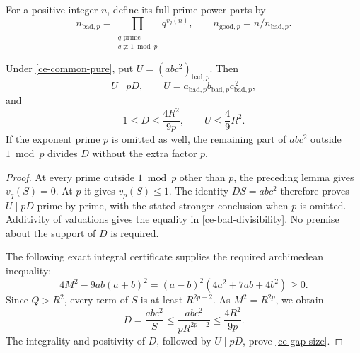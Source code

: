 For a positive integer $n$, define its full prime-power parts by
\[
 n_{\mathrm{bad},p}
 =\prod_{\substack{q\text{ prime}\\q\not\equiv1\bmod p}}q^{v_q(n)},
 \qquad n_{\mathrm{good},p}=n/n_{\mathrm{bad},p}.
\]
\begin{theorem}
\label{ce-bad-budget}
Under \eqref{ce-common-pure}, put $U=(ab c^2)_{\mathrm{bad},p}$.
Then
\begin{equation}\label{ce-bad-divisibility}
 U\mid pD,\qquad
 U=a_{\mathrm{bad},p}b_{\mathrm{bad},p}
       c_{\mathrm{bad},p}^{\,2},
\end{equation}
and
\begin{equation}\label{ce-gap-size}
 1\le D\le\frac{4R^2}{9p},\qquad U\le\frac49R^2.
\end{equation}
If the exponent prime $p$ is omitted as well, the remaining part of
$ab c^2$ outside $1\bmod p$ divides $D$ without the extra factor $p$.
\end{theorem}
\begin{proof}
At every prime outside $1\bmod p$ other than $p$, the preceding
lemma gives $v_q(S)=0$. At $p$ it gives $v_p(S)\le1$.
The identity $DS=ab c^2$ therefore proves $U\mid pD$ prime by
prime, with the stated stronger conclusion when $p$ is omitted.
Additivity of valuations gives the equality in
\eqref{ce-bad-divisibility}. No premise about the support of $D$
is required.

The following exact integral certificate supplies the required
archimedean inequality:
\begin{equation}\label{ce-four-ninths-certificate}
 4M^2-9ab(a+b)^2=(a-b)^2(4a^2+7ab+4b^2)\ge0.
\end{equation}
Since $Q>R^2$, every term of $S$ is at least $R^{2p-2}$.
As $M^2=R^{2p}$, we obtain
\[
 D=\frac{ab c^2}{S}
 \le\frac{ab c^2}{pR^{2p-2}}
 \le\frac{4R^2}{9p}.
\]
The integrality and positivity of $D$, followed by $U\mid pD$,
prove \eqref{ce-gap-size}.
\end{proof}

